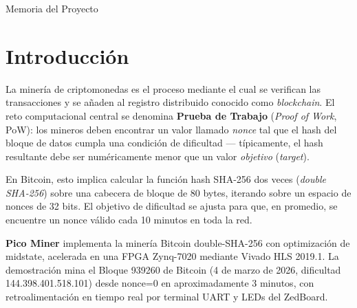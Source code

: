 \documentclass[12pt,a4paper]{article}
\begin{document}
\begin{titlepage}
\begin{center}
        \vfill

        \noindent\colorbox{medblue}{%
            \parbox{\dimexpr\textwidth-2\fboxsep}{%
                \centering\color{white}\normalsize
                \vspace{0.3cm}
                Memoria del Proyecto
                \vspace{0.3cm}
            }%
        }
    \end{center}
\end{titlepage}

\tableofcontents
\newpage

\section{Introducci\'on}

La miner\'ia de criptomonedas es el proceso mediante el cual se verifican las
transacciones y se a\~naden al registro distribuido conocido como \textit{blockchain}.
El reto computacional central se denomina \textbf{Prueba de Trabajo} (\textit{Proof of Work},
PoW): los mineros deben encontrar un valor llamado \textit{nonce} tal que el hash
del bloque de datos cumpla una condici\'on de dificultad --- t\'ipicamente, el hash
resultante debe ser num\'ericamente menor que un valor \textit{objetivo} (\textit{target}).

En Bitcoin, esto implica calcular la funci\'on hash SHA-256 dos veces
(\textit{double SHA-256}) sobre una cabecera de bloque de 80 bytes, iterando
sobre un espacio de nonces de 32 bits. El objetivo de dificultad se ajusta
para que, en promedio, se encuentre un nonce v\'alido cada 10 minutos en toda
la red.

\textbf{Pico Miner} implementa la miner\'ia Bitcoin double-SHA-256 con optimizaci\'on
de midstate, acelerada en una FPGA Zynq-7020 mediante Vivado HLS 2019.1.
La demostraci\'on mina el Bloque 939260 de Bitcoin (4 de marzo de 2026,
dificultad 144.398.401.518.101) desde nonce=0 en aproximadamente 3 minutos,
con retroalimentaci\'on en tiempo real por terminal UART y LEDs del ZedBoard.

\end{document}
